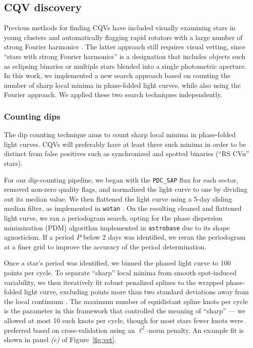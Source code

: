 \documentclass[11pt,twocolumn,tighten]{aastex63}
\begin{document}
\subsection{CQV discovery}
\label{subsec:discoverymethods}

Previous methods for finding CQVs have included visually examining
stars in young clusters
\citep{2016AJ....152..114R,2017AJ....153..152S} and automatically
flagging rapid rotators with a large number of strong Fourier
harmonics \citep{2019ApJ...876..127Z}.  The latter approach still
requires visual vetting, since ``stars with strong Fourier harmonics''
is a designation that includes objects such as eclipsing binaries or
multiple stars blended into a single photometric aperture.  In this
work, we implemented a new search approach based on counting the
number of sharp local minima in phase-folded light curves, while also
using the Fourier approach.  We applied these two
search techniques independently.   


\subsubsection{Counting dips}
\label{subsec:counting}

The dip counting technique aims to count sharp local minima in
phase-folded light curves.  CQVs will preferably have at least three
such minima in order to be distinct from false positives such as
synchronized and spotted binaries (``RS CVn'' stars). 

For our dip-counting pipeline, we began with the {\tt PDC\_SAP} flux
for each sector, removed non-zero quality flags, and normalized the
light curve to one by dividing out its median value.  We then
flattened the light curve using a 5-day sliding median filter, as
implemented in \texttt{wotan} \citep{2019AJ....158..143H}.  On the
resulting cleaned and flattened light curve, we ran a periodogram
search, opting for the \citet{1978ApJ...224..953S} phase dispersion
minimization (PDM) algorithm implemented in \texttt{astrobase}
\citep{2021zndo...1011188B} due to its shape agnosticism.  If a period
$P$ below 2 days was identified, we reran the periodogram at a finer
grid to improve the accuracy of the period determination.

Once a star's period was identified, we binned the phased light curve
to 100 points per cycle.  To separate ``sharp'' local minima from
smooth spot-induced variability, we then iteratively fit
robust penalized splines to the wrapped phase-folded light curve,
excluding points more than two standard deviations away from the local
continuum \citep{2019AJ....158..143H}.  The maximum number of
equidistant spline knots per cycle is the parameter in this framework
that controlled the meaning of ``sharp'' --- we allowed at most 10
such knots per cycle, though for most stars fewer knots were preferred
based on cross-validation using an $\ell^2$-norm penalty.  An example
fit is shown in panel {\it (e)} of Figure~\ref{fig:vet}.
\end{document}
